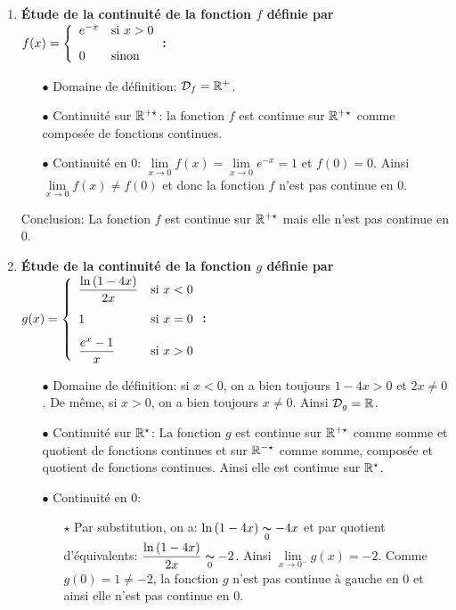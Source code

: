 \documentclass[a4paper, 11pt,reqno]{article}
\begin{document}
\begin{correction}  \;
	\begin{enumerate}
		\item \textbf{\'Etude de la continuit\'e de la fonction $f$ d\'efinie par $f(x)=\left\lbrace \begin{array}{ll}e^{-x}& \hbox{si}\ x>0\vsec\\ 0 &\hbox{sinon}  \end{array}\right.$:}
		      \begin{itemize}
			      \item[$\bullet$] Domaine de d\'efinition: $\mathcal{D}_f=\mathbb{R}^+$.
			      \item[$\bullet$] Continuit\'e sur $\mathbb{R}^{+\star}$: la fonction $f$ est continue sur $\mathbb{R}^{+\star}$ comme compos\'ee de fonctions continues.
			      \item[$\bullet$] Continuit\'e en 0: $\lim\limits_{x\to 0} f(x)=\lim\limits_{x\to 0} e^{-x}=1$ et $f(0)=0$. Ainsi $\lim\limits_{x\to 0} f(x)\not= f(0)$ et donc la fonction $f$ n'est pas continue en 0.
		      \end{itemize}
		      Conclusion: La fonction $f$ est continue sur $\mathbb{R}^{+\star}$ mais elle n'est pas continue en 0.
		\item \textbf{\'Etude de la continuit\'e de la fonction $g$ d\'efinie par $g(x)=\left\lbrace \begin{array}{ll} \ddp\frac{\ln{(1-4x)}}{2x}  & \hbox{si}\ x< 0\vsec\\ 1 &\hbox{si}\ x=0\vsec\\ \ddp\frac{e^x-1}{x} & \hbox{si}\ x>0  \end{array}\right.$:}
		      \begin{itemize}
			      \item[$\bullet$] Domaine de d\'efinition: si $x<0$, on a bien toujours $1-4x>0$ et $2x\not= 0$. De m\^{e}me, si $x>0$, on a bien toujours $x\not= 0$. Ainsi $\mathcal{D}_g=\mathbb{R}$.
			      \item[$\bullet$] Continuit\'e sur $\mathbb{R}^{\star}$: La fonction $g$ est continue sur $\mathbb{R}^{+\star}$ comme somme et quotient de fonctions continues et sur $\mathbb{R}^{-\star}$ comme somme, compos\'ee et quotient de fonctions continues. Ainsi elle est continue sur $\mathbb{R}^{\star}$.
			      \item[$\bullet$] Continuit\'e en 0:
			            \begin{itemize}
				            \item[$\star$] Par substitution, on a: $\ln{(1-4x)}\underset{0}{\thicksim} -4x$ et par quotient d'\'equivalents: $\displaystyle\frac{\ln{(1-4x)}}{2x}\underset{0}{\thicksim} -2$. Ainsi $\lim\limits_{x\to 0^-} g(x)=-2$. Comme $g(0)=1\not= -2$, la fonction $g$ n'est pas continue \`{a} gauche en 0 et ainsi elle n'est pas continue en 0.

\end{itemize}
\end{itemize}
\end{enumerate}
\end{correction}
\end{document}
